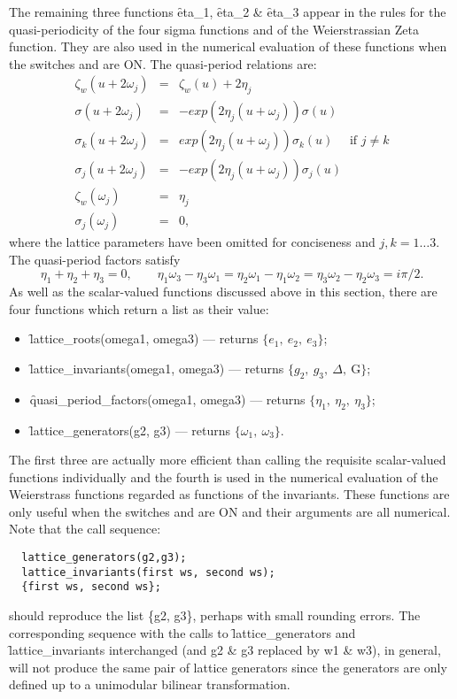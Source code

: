 The remaining three functions \f{eta\_1}, \f{eta\_2} \& \f{eta\_3} appear in
the rules for the quasi-periodicity of the four sigma functions and of the
Weierstrassian Zeta function. They are also used in the numerical
evaluation of these functions when the switches  and 
are ON. The quasi-period relations are:
\begin{eqnarray*}
  \zeta_w(u+2\omega_j) & = & \zeta_w(u)+2\eta_j\\
  \sigma(u+2\omega_j) & = & -exp(2\eta_j(u+\omega_j))\sigma(u)\\
  \sigma_k(u+2\omega_j) & = &  exp(2\eta_j(u+\omega_j))\sigma_k(u) \quad\text{  if  }j\neq k\\
  \sigma_j(u+2\omega_j) & = & -exp(2\eta_j(u+\omega_j))\sigma_j(u)\\
  \zeta_w(\omega_j) & = & \eta_j\\
  \sigma_j(\omega_j) & = & 0,
\end{eqnarray*}
where the lattice parameters have been omitted for conciseness and $j,k = 1\ldots 3$.
The quasi-period factors satisfy
\[\eta_1+\eta_2+\eta_3=0,\qquad
   \eta_1\omega_3-\eta_3\omega_1=\eta_2\omega_1-\eta_1\omega_2=\eta_3\omega_2-\eta_2\omega_3=i\pi/2.\]
As well as the scalar-valued functions discussed above in this section,
there are four functions which return a list as their value:
\begin{itemize}
\item \f{lattice\_roots(omega1, omega3)} --- returns $\{e_1,\ e_2,\ e_3\}$;
\item \f{lattice\_invariants(omega1, omega3)} --- returns
  $\{g_2,\ g_3,\ \Delta,\ \mathrm{G}\}$;
\item \f{quasi\_period\_factors(omega1, omega3)}
  --- returns $\{\eta_1,\ \eta_2,\ \eta_3\}$;
\item \f{lattice\_generators(g2, g3)}  --- returns $\{\omega_1,\ \omega_3\}$.
\end{itemize}
The first three are actually more efficient than calling the requisite
scalar-valued functions individually and the fourth is used in the numerical
evaluation of the Weierstrass functions regarded as functions of the
invariants. These functions are only useful when the switches  and
 are ON and their arguments are all numerical.
Note that the call sequence:
\begin{verbatim}
  lattice_generators(g2,g3);
  lattice_invariants(first ws, second ws);
  {first ws, second ws};
\end{verbatim}
should reproduce the list \{g2, g3\}, perhaps with small rounding errors. The
corresponding sequence with the calls to \f{lattice\_generators} and
\f{lattice\_invariants} interchanged (and g2 \& g3 replaced by w1 \& w3),
in general, will not produce the same pair of lattice generators since the
generators are only defined up to a unimodular bilinear transformation.

